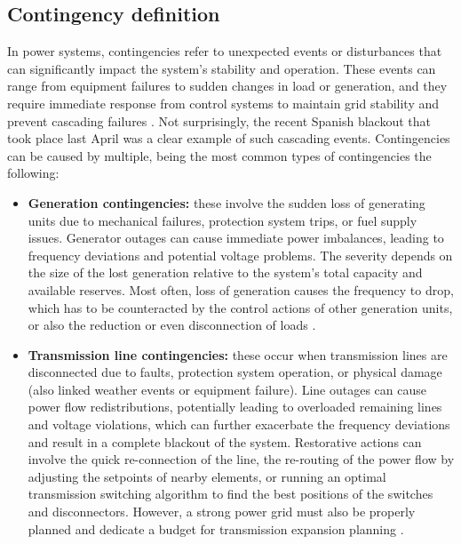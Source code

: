 \documentclass{article}
\begin{document}
\subsection{Contingency definition}
In power systems, contingencies refer to unexpected events or disturbances that can significantly impact the system's stability and operation. These events can range from equipment failures to sudden changes in load or generation, and they require immediate response from control systems to maintain grid stability and prevent cascading failures \cite{contingency:analysis}. Not surprisingly, the recent Spanish blackout that took place last April was a clear example of such cascading events. Contingencies can be caused by multiple, being the most common types of contingencies the following:

\begin{itemize}

\item \textbf{Generation contingencies:} these involve the sudden loss of generating units due to mechanical failures, protection system trips, or fuel supply issues. Generator outages can cause immediate power imbalances, leading to frequency deviations and potential voltage problems. The severity depends on the size of the lost generation relative to the system's total capacity and available reserves. Most often, loss of generation causes the frequency to drop, which has to be counteracted by the control actions of other generation units, or also the reduction or even disconnection of loads \cite{marzband2016adaptive}. 

\item \textbf{Transmission line contingencies:} these occur when transmission lines are disconnected due to faults, protection system operation, or physical damage (also linked weather events or equipment failure). Line outages can cause power flow redistributions, potentially leading to overloaded remaining lines and voltage violations, which can further exacerbate the frequency deviations and result in a complete blackout of the system. Restorative actions can involve the quick re-connection of the line, the re-routing of the power flow by adjusting the setpoints of nearby elements, or running an optimal transmission switching algorithm to find the best positions of the switches and disconnectors. However, a strong power grid must also be properly planned and dedicate a budget for transmission expansion planning \cite{aeggegn2020load}. 


\end{itemize}
\end{document}
